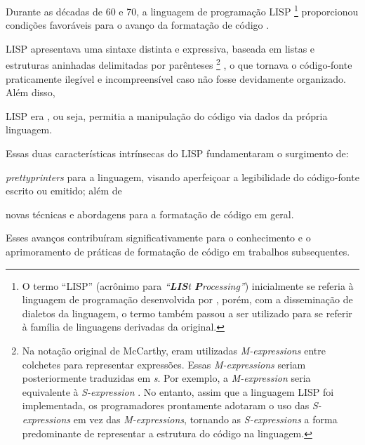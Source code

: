 \documentclass
  [11pt,a4paper,english,brazil,openright,sumario=tradicional,twoside]
  {abntex2}
\begin{document}
  Durante as décadas de 60 e 70, a linguagem de programação LISP%
  \footnote
    { O termo ``LISP'' (acrônimo para
      \textit{``\textbf{LIS}t \textbf{P}rocessing''}) inicialmente se referia à
      linguagem de programação desenvolvida por
      \textcite{mccarthy-1960-recursive}, porém, com a disseminação de dialetos
      da linguagem, o termo também passou a ser utilizado para se referir à
      família de linguagens derivadas da original.}
  proporcionou condições favoráveis para o avanço da formatação de código
  \cite[2]{yelland-2015-new}.
  \begin{inparaenum}
    \item LISP apresentava uma sintaxe distinta e expressiva, baseada em listas
          e estruturas aninhadas delimitadas por parênteses%
          \footnote
            { Na notação original de McCarthy, eram utilizadas
              \textit{M-expressions} entre colchetes para representar
              expressões. Essas \textit{M-expressions} seriam posteriormente
              traduzidas em \textit{s}. Por exemplo, a
              \textit{M-expression} \usebox{\mexpressionexample} seria
              equivalente à \textit{S-expression} \usebox{\sexpressionexample}.
              No entanto, assim que a linguagem LISP foi implementada, os
              programadores prontamente adotaram o uso das
              \textit{S-expressions} em vez das \textit{M-expressions},
              tornando as \textit{S-expressions} a forma predominante de
              representar a estrutura do código na linguagem.}%
          , o que tornava o código-fonte praticamente ilegível e
          incompreensível caso não fosse devidamente organizado. Além disso,
    \item LISP era , ou seja, permitia a manipulação do
          código via dados da própria linguagem.
  \end{inparaenum}
  Essas duas características intrínsecas do LISP fundamentaram o surgimento de:
  \begin{inparaenum}
    \item \textit{prettyprinters} para a linguagem, visando aperfeiçoar a
          legibilidade do código-fonte escrito ou emitido; além de
    \item novas técnicas e abordagens para a formatação de código em geral.
  \end{inparaenum}
  Esses avanços contribuíram significativamente para o conhecimento e o
  aprimoramento de práticas de formatação de código em trabalhos subsequentes.
\end{document}
